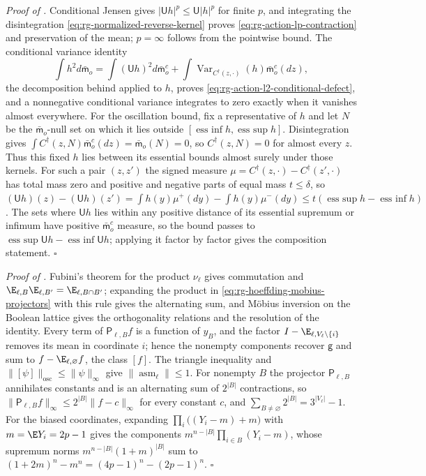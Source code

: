 \noindent\emph{Proof of .}
Conditional Jensen gives $\lvert\mathsf Uh\rvert^p\le\mathsf U\lvert h\rvert^p$ for
finite $p$, and integrating the disintegration
\eqref{eq:rg-normalized-reverse-kernel} proves
\eqref{eq:rg-action-lp-contraction} and preservation of the mean; $p=\infty$
follows from the pointwise bound. The conditional variance identity
\begin{equation}
\int h^2d\bar{\mathsf m}_o
=\int(\mathsf Uh)^2d\bar{\mathsf m}_o^c
+\int\operatorname{Var}_{C^\dagger(z,\cdot)}(h)\bar{\mathsf m}_o^c(dz),
\label{eq:rg-action-total-conditional-variance}
\end{equation}
the decomposition behind  applied to $h$, proves
\eqref{eq:rg-action-l2-conditional-defect}, and a nonnegative conditional variance
integrates to zero exactly when it vanishes almost everywhere. For the oscillation
bound, fix a representative of $h$ and let $N$ be the $\bar{\mathsf m}_o$-null set on which it
lies outside $[\operatorname{ess~inf}h,\operatorname{ess~sup}h]$. Disintegration gives
$\int C^\dagger(z,N)\bar{\mathsf m}_o^c(dz)=\bar{\mathsf m}_o(N)=0$, so
$C^\dagger(z,N)=0$ for almost every $z$. Thus this fixed $h$ lies between its essential bounds
almost surely under those kernels. For such a pair
$(z,z')$ the signed measure $\mu=C^\dagger(z,\cdot)-C^\dagger(z',\cdot)$ has total
mass zero and positive and negative parts of equal mass $t\le\delta$, so
$(\mathsf Uh)(z)-(\mathsf Uh)(z')=\int h(y)\mu^+(dy)-\int h(y)\mu^-(dy)
\le t(\operatorname{ess~sup}h-\operatorname{ess~inf}h)$. The sets where
$\mathsf Uh$ lies within any positive distance of its essential supremum or
infimum have positive $\bar{\mathsf m}_o^c$ measure, so the bound passes to
$\operatorname{ess~sup}\mathsf Uh-\operatorname{ess~inf}\mathsf Uh$; applying it
factor by factor gives the composition statement. $\square$

\noindent\emph{Proof of .}
Fubini's theorem for the product $\nu_\ell$ gives commutation and
$\E_{\ell,B}\E_{\ell,B'}=\E_{\ell,B\cap B'}$; expanding the
product in \eqref{eq:rg-hoeffding-mobius-projectors} with this rule gives the
alternating sum, and M\"obius inversion on the Boolean lattice gives the
orthogonality relations and the resolution of the identity. Every term of
$\mathsf P_{\ell,B}f$ is a function of $y_B$, and the factor
$I-\E_{\ell,V_\ell\setminus\{i\}}$ removes its mean in coordinate $i$; hence
the nonempty components recover $\mathsf g$ and sum to
$f-\E_{\ell,\varnothing}f$, the class $[f]$. The triangle inequality and
$\lVert[\psi]\rVert_{\mathrm{osc}}\le\lVert\psi\rVert_\infty$ give
$\lVert\operatorname{asm}_\ell\rVert\le1$. For nonempty $B$ the projector
$\mathsf P_{\ell,B}$ annihilates constants and is an alternating sum of
$2^{\lvert B\rvert}$ contractions, so
$\lVert\mathsf P_{\ell,B}f\rVert_\infty\le2^{\lvert B\rvert}\lVert f-c\rVert_\infty$
for every constant $c$, and
$\sum_{B\ne\varnothing}2^{\lvert B\rvert}=3^{\lvert V_\ell\rvert}-1$. For the
biased coordinates, expanding $\prod_i\bigl((Y_i-m)+m\bigr)$ with
$m=\E Y_i=2p-1$ gives the components $m^{n-\lvert B\rvert}\prod_{i\in B}(Y_i-m)$,
whose supremum norms $m^{n-\lvert B\rvert}(1+m)^{\lvert B\rvert}$ sum to
$(1+2m)^n-m^n=(4p-1)^n-(2p-1)^n$. $\square$

